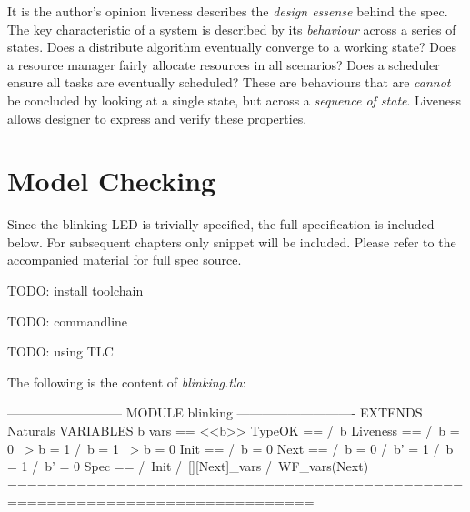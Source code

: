 \documentclass{report}
\begin{document}
It is the author's opinion liveness describes the \textit{design essense} behind
the spec. The key characteristic of a system is described by its
\textit{behaviour} across a series of states. Does a distribute algorithm
eventually converge to a working state? Does a resource manager fairly allocate
resources in all scenarios? Does a scheduler ensure all tasks are eventually
scheduled? These are behaviours that are \textit{cannot} be concluded by looking
at a single state, but across a \textit{sequence of state}. Liveness allows 
designer to express and verify these properties.

\section{Model Checking}

Since the blinking LED is trivially specified, the full specification is
included below. For subsequent chapters only snippet will be included. Please
refer to the accompanied material for full spec source. 

TODO: install toolchain 

TODO: commandline

TODO: using TLC

The following is the content of \textit{blinking.tla}:
\begin{tla}
--------------------------- MODULE blinking ----------------------------
EXTENDS Naturals
VARIABLES b 
vars == <<b>>
TypeOK ==
  /\ b  
Liveness == 
    /\ b = 0 ~> b = 1
    /\ b = 1 ~> b = 0
Init ==
  /\ b = 0
Next ==
  \/ /\ b = 0
     /\ b' = 1
  \/ /\ b = 1
     /\ b' = 0
Spec ==
  /\ Init
  /\ [][Next]_vars
  /\ WF_vars(Next)
=============================================================================
\end{tla}
\begin{tlatex}
\@x{}\moduleLeftDash{}\moduleRightDash\@xx{}%
%
%
%
%
%
%
%
%
%
%
%
%
%
%
%
%
%
%
%
\@x{}\bottombar\@xx{}%
\end{tlatex}
\end{document}
